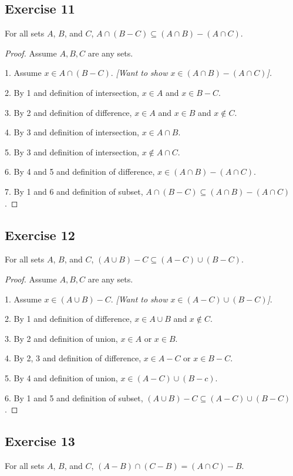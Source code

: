 \documentclass[14pt]{extarticle}
\begin{document}
\subsection{Exercise 11}
For all sets $A$, $B$, and $C$, \(A \cap (B - C) \subseteq (A \cap B) - (A \cap C)\).

\begin{proof}
  Assume $A,B,C$ are any sets.

  1. Assume \(x \in A \cap (B - C)\). {\it [Want to show \(x \in (A \cap B) - (A \cap C)\)].}

  2. By 1 and definition of intersection, $x \in A$ and $x \in B-C$.

  3. By 2 and definition of difference, $x \in A$ and $x \in B$ and $x \notin C$.

  4. By 3 and definition of intersection, $x \in A \cap B$.

  5. By 3 and definition of intersection, $x \notin A \cap C$.

  6. By 4 and 5 and definition of difference, \(x \in (A \cap B) - (A \cap C)\).

  7. By 1 and 6 and definition of subset, \(A \cap (B - C) \subseteq (A \cap B) - (A \cap C)\).
\end{proof}

\subsection{Exercise 12}
For all sets $A$, $B$, and $C$, \((A \cup B) - C \subseteq (A - C) \cup (B - C)\).

\begin{proof}
  Assume $A,B,C$ are any sets.

  1. Assume \(x \in (A \cup B) - C\). {\it [Want to show \(x \in (A - C) \cup (B - C)\)]}.

  2. By 1 and definition of difference, \(x \in A \cup B\) and \(x \notin C\).

  3. By 2 and definition of union, $x \in A$ or $x \in B$.

  4. By 2, 3 and definition of difference, $x \in A-C$ or $x \in B-C$.

  5. By 4 and definition of union, \(x \in (A-C) \cup (B-c)\).

  6. By 1 and 5 and definition of subset, \((A \cup B) - C \subseteq (A - C) \cup (B - C)\).
\end{proof}

\subsection{Exercise 13}
For all sets $A$, $B$, and $C$, \((A - B) \cap (C - B) = (A \cap C) - B\).
\end{document}
